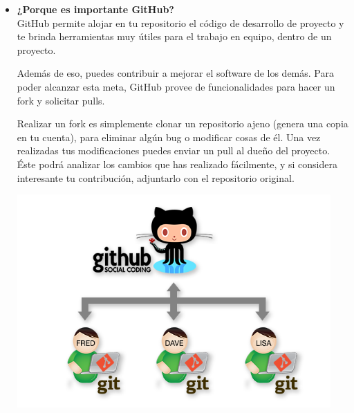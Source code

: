 \begin{itemize} %
\item \textbf{¿Porque es importante GitHub?}\\

GitHub permite alojar en tu repositorio el código de desarrollo de proyecto y te brinda herramientas muy útiles para el trabajo en equipo, dentro de un proyecto.

Además de eso, puedes contribuir a mejorar el software de los demás. Para poder alcanzar esta meta, GitHub provee de funcionalidades para hacer un fork y solicitar pulls.

Realizar un fork es simplemente clonar un repositorio ajeno (genera una copia en tu cuenta), para eliminar algún bug o modificar cosas de él. Una vez realizadas tus modificaciones puedes enviar un pull al dueño del proyecto. Éste podrá analizar los cambios que has realizado fácilmente, y si considera interesante tu contribución, adjuntarlo con el repositorio original.\\

\begin{center}
\includegraphics[width=12cm]{./Imagenes/actividad0302} 
\end{center}
	
\end{itemize} 


